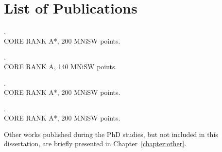 \clearpage
\section*{List of Publications}

\begin{enumerate}[label={[\Roman*]},widest=IV]
    \item\label{thesis-publication:pardyl2023active} .\\ CORE RANK A*, 200 MNiSW points.
    \item\label{thesis-publication:pardyl2023grids} .\\ CORE RANK A, 140 MNiSW points.
    \item\label{thesis-publication:pardyl2024adaglimpse} .\\ CORE RANK A*, 200 MNiSW points.
    \item\label{thesis-publication:pardyl2025flysearch} .\\ CORE RANK A*, 200 MNiSW points.
\end{enumerate}

Other works published during the PhD studies, but not included in this dissertation, are
briefly presented in Chapter~\ref{chapter:other}.
